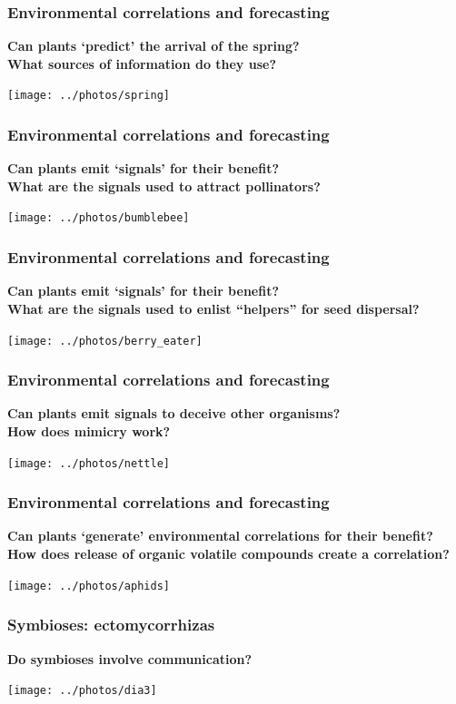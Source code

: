 \documentclass[10pt]{beamer}
\begin{document}
\begin{frame}
\frametitle{Environmental correlations and forecasting \Discussion}

\textbf{Can plants `predict' the arrival of the spring?\\
 What sources of information do they use?}

    \centering
    \texttt{[image: ../photos/spring]}
\end{frame}

\begin{frame}
\frametitle{Environmental correlations and forecasting \Discussion}

\textbf{Can plants emit `signals' for their benefit?\\
What are the signals used to attract pollinators?}

    \centering
    \texttt{[image: ../photos/bumblebee]}
\end{frame}

\begin{frame}
\frametitle{Environmental correlations and forecasting \Discussion}

\textbf{Can plants emit `signals' for their benefit?\\
What are the signals used to enlist ``helpers'' for seed dispersal?}

    \centering
    \texttt{[image: ../photos/berry\_eater]}
\end{frame}

\begin{frame}
\frametitle{Environmental correlations and forecasting \Discussion}

\textbf{Can plants emit signals to deceive other organisms?\\
How does mimicry work?}

    \centering
    \texttt{[image: ../photos/nettle]}
\end{frame}

\begin{frame}
\frametitle{Environmental correlations and forecasting \Discussion}

\textbf{Can plants `generate' environmental correlations for their benefit?\\
How does release of organic volatile compounds create a correlation?}

    \centering
    \texttt{[image: ../photos/aphids]}
\end{frame}

\begin{frame}
\frametitle{Symbioses: ectomycorrhizas \Discussion}

\textbf{Do symbioses involve communication?}

    \centering
    \texttt{[image: ../photos/dia3]}
\end{frame}
\end{document}
